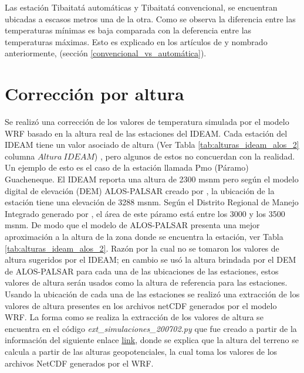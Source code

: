 Las estación Tibaitatá automáticas y Tibaitatá convencional, se encuentran ubicadas a escasos metros una de la otra. Como se observa la diferencia entre las temperaturas mínimas es baja comparada con la deferencia entre las temperaturas máximas. Esto es explicado en los artículos de \citet{lacombe2010results, kaspar2016climate} y nombrado anteriormente, (sección \ref{convencional_vs_automática}).

\section{Corrección por altura}

Se realizó una corrección de los valores de temperatura simulada por el modelo WRF basado en la altura real de las estaciones del IDEAM. Cada estación del IDEAM tiene un valor asociado de altura (Ver Tabla \ref{tab:alturas_ideam_alos_2} columna $ Altura\ IDEAM$) , pero algunos de estos no concuerdan con la realidad. Un ejemplo de esto es el caso de la estación llamada Pmo (Páramo) Guacheneque. El IDEAM reporta una altura de 2300 msnm pero según el modelo digital de elevación (DEM) ALOS-PALSAR creado por \citet{ASFDAAC2007}, la ubicación de la estación tiene una elevación de 3288 msnm. Según el Distrito Regional de Manejo Integrado generado por \citet{Corpochivor2011}, el área de este páramo está entre los 3000 y los 3500 msnm. De modo que el modelo de ALOS-PALSAR presenta una mejor aproximación a la altura de la zona donde se encuentra la estación, ver Tabla \ref{tab:alturas_ideam_alos_2}. Razón por la cual no se tomaron los valores de altura sugeridos por el IDEAM; en cambio se usó la altura brindada por el DEM de ALOS-PALSAR para cada una de las ubicaciones de las estaciones, estos valores de altura serán usados como la altura de referencia para las estaciones. Usando la ubicación de cada una de las estaciones se realizó una extracción de los valores de altura presentes en los archivos netCDF generados por el modelo WRF. La forma como se realiza la extracción de los valores de altura se encuentra en el código \textit{ext\_simulaciones\_200702.py} que fue creado a partir de la información del siguiente enlace \textcolor{blue}{\href{http://www.openwfm.org/wiki/How_to_interpret_WRF_variables}{link}}, donde se explica que la altura del terreno se calcula a partir de las alturas geopotenciales, la cual toma los valores de los archivos NetCDF generados por el WRF.\\

